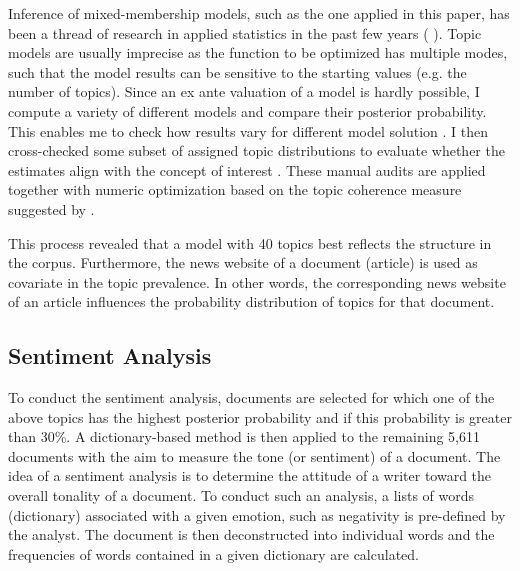 \documentclass[12pt,a4paper,notitlepage]{article}
\begin{document}
Inference of mixed-membership models, such as the one applied in this paper, has been a thread of research in applied statistics in the past few years (\citet{blei_latent_2003} \citet{erosheva_mixed-membership_2004} \citet{braun_variational_2010}). Topic models are usually imprecise as the function to be optimized has multiple modes, such that the model results can be sensitive to the starting values (e.g. the number of topics). Since an ex ante valuation of a model is hardly possible, I compute a variety of different models and compare their posterior probability. This enables me to check how results vary for different model solution \citep{roberts_navigating_2016}. I then cross-checked some subset of assigned topic distributions to evaluate whether the estimates align with the concept of interest \citep{gentzkow_text_2017}. These manual audits are applied together with numeric optimization based on the topic coherence measure suggested by \citet{mimno_optimizing_2011}. 

This process revealed that a model with 40 topics best reflects the structure in the corpus. Furthermore, the news website of a document (article) is used as covariate in the topic prevalence. In other words, the corresponding news website of an article influences the probability distribution of topics for that document. 

\subsection{Sentiment Analysis}

To conduct the sentiment analysis, documents are selected for which one of the above topics has the highest posterior probability and if this probability is greater than 30\%. A dictionary-based method is then applied to the remaining 5,611 documents with the aim to measure the tone (or sentiment) of a document. The idea of a sentiment analysis is to determine the attitude of a writer toward the overall tonality of a document. To conduct such an analysis, a lists of words (dictionary) associated with a given emotion, such as negativity is pre-defined by the analyst. The document is then deconstructed into individual words and the frequencies of words contained in a given dictionary are calculated. 
\end{document}
